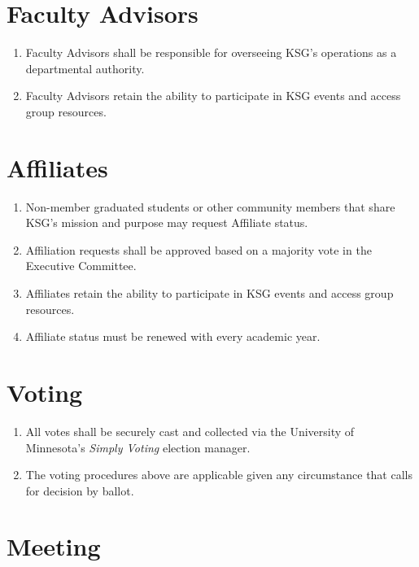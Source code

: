 \documentclass[12pt,executivepaper]{article}
\begin{document}
\section{Faculty Advisors}

\begin{enumerate}
    \item Faculty Advisors shall be responsible for overseeing KSG's operations
          as a departmental authority.
    \item Faculty Advisors retain the ability to participate in KSG events and
          access group resources.
\end{enumerate}

\section{Affiliates}

\begin{enumerate}
    \item Non-member graduated students or other community members that
          share KSG's mission and purpose may request Affiliate status.
    \item Affiliation requests shall be approved based on a majority vote in
          the Executive Committee.
    \item Affiliates retain the ability to participate in KSG events and
          access group resources.
    \item Affiliate status must be renewed with every academic year.
\end{enumerate}

\section{Voting}

\begin{enumerate}
    \item All votes shall be securely cast and collected via the University of
          Minnesota's \textit{Simply Voting} election manager.
    \item The voting procedures above are applicable given any circumstance
	  that calls for decision by ballot.
\end{enumerate}

\section{Meeting}
\end{document}
